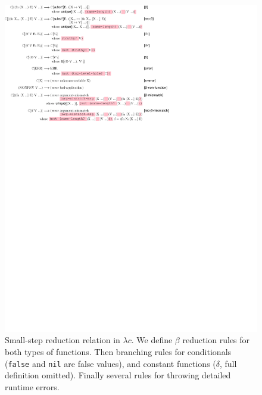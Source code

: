 \begin{figure}
  \includegraphics[]{redex/arrowv.pdf}
\caption{Small-step reduction relation in $\lambda c$.
  We define $\beta$ reduction rules for both types of functions.
  Then branching rules for conditionals (\texttt{false} and \texttt{nil} are false values),
  and constant functions ($\delta$, full definition omitted).
  Finally several rules for throwing detailed runtime errors.
  }
\end{figure}

